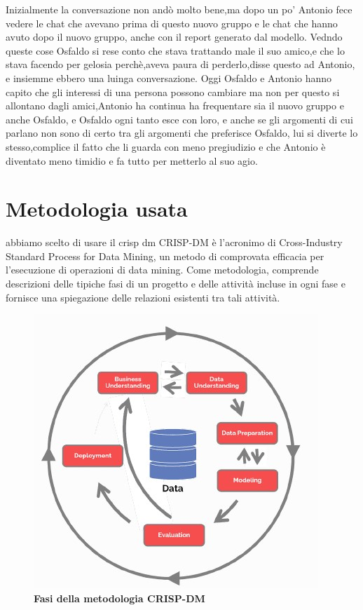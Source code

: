 \documentclass{article}
\begin{document}
Inizialmente la conversazione non andò molto bene,ma dopo un po' Antonio fece vedere le chat che avevano prima di questo nuovo gruppo e le chat che hanno avuto dopo il nuovo gruppo, anche con il report generato dal modello.
Vedndo queste cose Osfaldo si rese conto che stava trattando male il suo amico,e che lo stava facendo per gelosia perchè,aveva paura di perderlo,disse questo ad Antonio, e insiemme ebbero una luinga conversazione.
Oggi Osfaldo e Antonio hanno capito che gli interessi di una persona possono cambiare ma non per questo si allontano dagli amici,Antonio ha continua ha frequentare sia il nuovo gruppo e anche Osfaldo, e Osfaldo ogni tanto esce con loro, e anche se gli argomenti di cui parlano non sono di certo tra gli argomenti che preferisce Osfaldo, lui si diverte lo stesso,complice il fatto che li guarda con meno pregiudizio e che Antonio è diventato meno timidio e fa tutto per metterlo al suo agio.

\section{Metodologia usata}\label{sec:metodologia-usata}
abbiamo scelto di usare il crisp dm
CRISP-DM è l’acronimo di Cross-Industry Standard Process for Data Mining, un metodo di comprovata efficacia per l’esecuzione di operazioni di data mining. Come metodologia, comprende
descrizioni delle tipiche fasi di un progetto e delle attività incluse in ogni fase e fornisce una spiegazione delle relazioni esistenti tra tali attività.
\begin{figure}[h!]
    \centering
    \includegraphics{images/crisp}
    \caption{\textbf{Fasi della metodologia CRISP-DM}}
    \label{fig:crisp-dm}
\end{figure}
\end{document}
